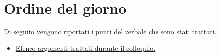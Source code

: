 \clearpage
\section{Ordine del giorno}
Di seguito vengono riportati i punti del verbale che sono stati trattati.
\begin{itemize}
	\item \hyperref[sec:elenco]{Elenco argomenti trattati durante il colloquio.}
\end{itemize}